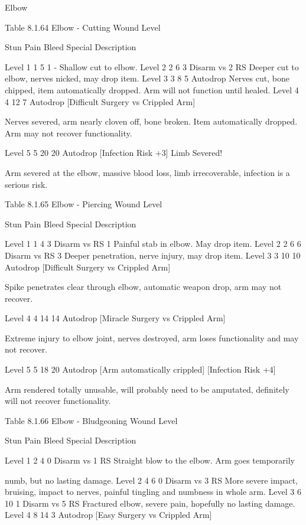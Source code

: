 \documentclass[oneside,11pt,english]{book}
\begin{document}
 

 

Elbow 

 
Table 8.1.64 Elbow - Cutting 
Wound 
Level 

Stun Pain Bleed Special Description 

Level 1 1 5 1 - Shallow cut to elbow. 
Level 2 2 6 3 Disarm vs 2 RS Deeper cut to elbow, nerves nicked, may drop item. 
Level 3 3 8 5 Autodrop Nerves cut, bone chipped, item automatically dropped. 
Arm will not function until healed. 
Level 4 4 12 7 Autodrop 
[Difficult Surgery vs 
Crippled Arm] 

Nerves severed, arm nearly cloven off, bone broken. 
Item automatically dropped. Arm may not recover 
functionality. 

Level 5 5 20 20 Autodrop 
[Infection Risk +3] 
Limb Severed! 

Arm severed at the elbow, massive blood loss, limb 
irrecoverable, infection is a serious risk. 

 
Table 8.1.65 Elbow - Piercing 
Wound 
Level 

Stun Pain Bleed Special Description 

Level 1 1 4 3 Disarm vs RS 1 Painful stab in elbow. May drop item. 
Level 2 2 6 6 Disarm vs RS 3 Deeper penetration, nerve injury, may drop item. 
Level 3 3 10 10 Autodrop 
[Difficult Surgery vs 
Crippled Arm] 

Spike penetrates clear through elbow, automatic 
weapon drop, arm may not recover. 

Level 4 4 14 14 Autodrop 
[Miracle Surgery vs 
Crippled Arm] 

Extreme injury to elbow joint, nerves destroyed, 
arm loses functionality and may not recover. 

Level 5 5 18 20 Autodrop 
[Arm automatically 
crippled] [Infection Risk 
+4] 

Arm rendered totally unusable, will probably need 
to be amputated, definitely will not recover 
functionality. 

 
Table 8.1.66 Elbow - Bludgeoning 
Wound 
Level 

Stun Pain Bleed Special Description 

Level 1 2 4 0 Disarm vs 1 RS Straight blow to the elbow. Arm goes temporarily 


numb, but no lasting damage. 
Level 2 4 6 0 Disarm vs 3 RS More severe impact, bruising, impact to nerves, 
painful tingling and numbness in whole arm. 
Level 3 6 10 1 Disarm vs 5 RS Fractured elbow, severe pain, hopefully no lasting 
damage. 
Level 4 8 14 3 Autodrop [Easy Surgery 
vs Crippled Arm] 
\end{document}
